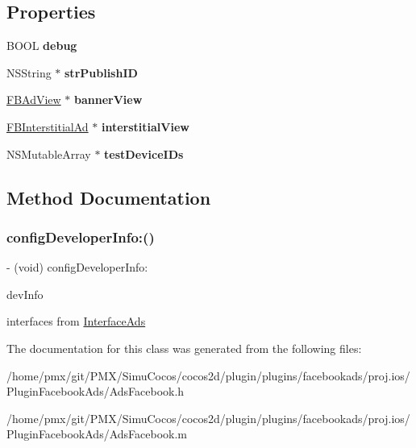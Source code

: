 \subsection*{Properties}
\begin{DoxyCompactItemize}
\item 
\mbox{\label{interfaceAdsFacebook_ac59b9e183173740aa5937cd8a773a832}} 
B\+O\+OL {\bfseries debug}
\item 
\mbox{\label{interfaceAdsFacebook_afb716664cc470fc1b4dbd855089dfba9}} 
N\+S\+String $\ast$ {\bfseries str\+Publish\+ID}
\item 
\mbox{\label{interfaceAdsFacebook_ac2d87ea856446debae3ccedce25b1f8e}} 
\hyperlink{interfaceFBAdView}{F\+B\+Ad\+View} $\ast$ {\bfseries banner\+View}
\item 
\mbox{\label{interfaceAdsFacebook_ab80685f999570fa9c01bda5b7865fc9c}} 
\hyperlink{interfaceFBInterstitialAd}{F\+B\+Interstitial\+Ad} $\ast$ {\bfseries interstitial\+View}
\item 
\mbox{\label{interfaceAdsFacebook_a330ee1de7f4d404cf767d9783de30d9e}} 
N\+S\+Mutable\+Array $\ast$ {\bfseries test\+Device\+I\+Ds}
\end{DoxyCompactItemize}


\subsection{Method Documentation}
\mbox{\label{interfaceAdsFacebook_a756f0ada92d7104c4767379535ae9d4c}} 
\subsubsection{\texorpdfstring{config\+Developer\+Info\+:()}{configDeveloperInfo:()}}
{\footnotesize\ttfamily -\/ (void) config\+Developer\+Info\+: \begin{DoxyParamCaption}\item[{(N\+S\+Mutable\+Dictionary$\ast$)}]{dev\+Info }\end{DoxyParamCaption}}

interfaces from \hyperlink{classInterfaceAds-p}{Interface\+Ads} 

The documentation for this class was generated from the following files\+:\begin{DoxyCompactItemize}
\item 
/home/pmx/git/\+P\+M\+X/\+Simu\+Cocos/cocos2d/plugin/plugins/facebookads/proj.\+ios/\+Plugin\+Facebook\+Ads/Ads\+Facebook.\+h\item 
/home/pmx/git/\+P\+M\+X/\+Simu\+Cocos/cocos2d/plugin/plugins/facebookads/proj.\+ios/\+Plugin\+Facebook\+Ads/Ads\+Facebook.\+m\end{DoxyCompactItemize}

